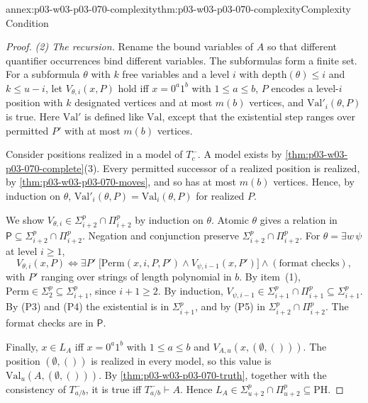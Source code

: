 \begin{annexitem}{annex:p03-w03-p03-070-complexity}{thm:p03-w03-p03-070-complexity}{Complexity Condition}
\begin{proof}
\emph{(2) The recursion.}  Rename the bound variables of \(A\) so that
different quantifier occurrences bind different variables.  The subformulas
form a finite set.  For a subformula \(\theta\) with \(k\) free variables and
a level \(i\) with \(\mathrm{depth}(\theta)\leq i\) and \(k\leq u-i\), let
\(V_{\theta,i}(x,P)\) hold iff \(x=0^a1^b\) with \(1\leq a\leq b\), \(P\) encodes
a level-\(i\) position with \(k\) designated vertices and at most \(m(b)\)
vertices, and \(\mathrm{Val}'_i(\theta,P)\) is true.  Here \(\mathrm{Val}'\)
is defined like \(\mathrm{Val}\), except that the existential step ranges
over permitted \(P'\) with at most \(m(b)\) vertices.

Consider positions realized in a model of \(T^-_c\).  A model exists by
\cref{thm:p03-w03-p03-070-complete}(3).  Every permitted successor of a realized position is
realized, by \cref{thm:p03-w03-p03-070-moves}, and so has at most \(m(b)\)
vertices.  Hence, by induction on \(\theta\),
\(\mathrm{Val}'_i(\theta,P)=\mathrm{Val}_i(\theta,P)\) for realized \(P\).

We show \(V_{\theta,i}\in\Sigma^p_{i+2}\cap\Pi^p_{i+2}\) by induction on \(\theta\).  Atomic
\(\theta\) gives a relation in \(\mathsf P\subseteq\Sigma^p_{i+2}\cap\Pi^p_{i+2}\).  Negation
and conjunction preserve \(\Sigma^p_{i+2}\cap\Pi^p_{i+2}\).  For \(\theta=\exists w\,\psi\)
at level \(i\geq1\),
\[
 V_{\theta,i}(x,P)\iff\exists P'\;\bigl[\mathrm{Perm}(x,i,P,P')\wedge
 V_{\psi,i-1}(x,P')\bigr]\wedge(\text{format checks}),
\]
with \(P'\) ranging over strings of length polynomial in \(b\).  By item~(1),
\(\mathrm{Perm}\in\Sigma^p_2\subseteq\Sigma^p_{i+1}\), since \(i+1\geq2\).  By
induction, \(V_{\psi,i-1}\in\Sigma^p_{i+1}\cap\Pi^p_{i+1}\subseteq\Sigma^p_{i+1}\).  By
(P3) and (P4) the existential is in \(\Sigma^p_{i+1}\), and by (P5) in
\(\Sigma^p_{i+2}\cap\Pi^p_{i+2}\).  The format checks are in \(\mathsf P\).

Finally, \(x\in L_A\) iff \(x=0^a1^b\) with \(1\leq a\leq b\) and
\(V_{A,u}(x,(\emptyset,()))\).  The position \((\emptyset,())\) is realized in
every model, so this value is \(\mathrm{Val}_u(A,(\emptyset,()))\).  By
\cref{thm:p03-w03-p03-070-truth}, together with the consistency of
\(T^-_{a/b}\), it is true iff \(T^-_{a/b}\vdash A\).  Hence
\(L_A\in\Sigma^p_{u+2}\cap\Pi^p_{u+2}\subseteq\mathrm{PH}\).
\end{proof}
\end{annexitem}

